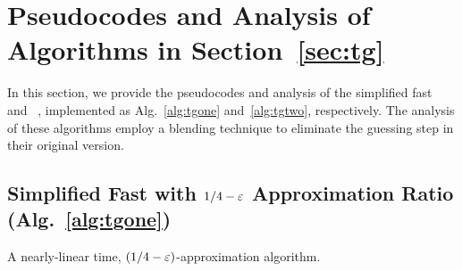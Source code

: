 \section{Pseudocodes and Analysis of Algorithms in Section~\ref{sec:tg}}
\label{apx:tg}
In this section, we provide the pseudocodes and analysis of
the simplified fast \ig~\citep{DBLP:conf/nips/Kuhnle19} 
and \itg~\citep{DBLP:conf/kdd/ChenK23},
implemented as Alg.~\ref{alg:tgone} and~\ref{alg:tgtwo}, respectively.
The analysis of these algorithms employ a blending technique
to eliminate the guessing step in their original version.
\subsection{Simplified Fast \ig with $1/4-\varepsilon$ Approximation Ratio (Alg.~\ref{alg:tgone})}
\begin{algorithm}[ht]
    \caption{A nearly-linear time, $(1/4-\varepsilon)$-approximation algorithm.}
    \label{alg:tgone}
\end{algorithm}
\thmtgone*
